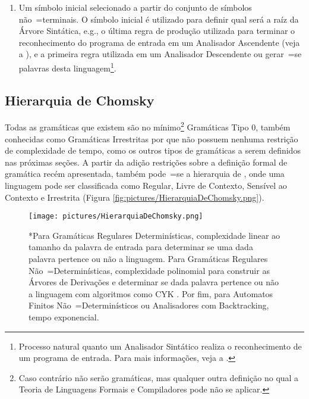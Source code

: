 {\begin{enumerate}
        \item Um símbolo inicial selecionado a partir do conjunto de símbolos não~=terminais.
        O símbolo inicial é utilizado para definir qual será a raíz da Árvore Sintática,
        e.g.,
        o última regra de produção utilizada para terminar o reconhecimento do programa de entrada em um Analisador Ascendente (veja a ),
        e a primeira regra utilizada em um Analisador Descendente ou
        gerar~=se palavras desta linguagem\footnote{
        Processo natural quanto um Analisador Sintático realiza o reconhecimento de um programa de entrada.
        Para mais informações,
        veja a .
        }.
    \end{enumerate}


\subsection{Hierarquia de Chomsky}
\label{hierarquiaDeChomsky}

    Todas as gramáticas que existem são no mínimo\footnote{
    Caso contrário não serão gramáticas,
    mas qualquer outra definição no qual a Teoria de Linguagens Formais e
    Compiladores pode não se aplicar.
    }
    Gramáticas Tipo 0,
    também conhecidas como Gramáticas Irrestritas por que não possuem nenhuma restrição de complexidade de tempo,
    como os outros tipos de gramáticas a serem definidos nas próximas seções{}.
    A partir da adição restrições sobre a definição formal de gramática recém apresentada,
    também pode~=se  a hierarquia de ,
    onde uma linguagem pode ser classificada como Regular,
    Livre de Contexto,
    Sensível ao Contexto e
    Irrestrita (Figura \ref{fig:pictures/HierarquiaDeChomsky.png}).
    \begin{figure}[h]
    \centering
    \texttt{[image: pictures/HierarquiaDeChomsky.png]}
    \begin{minipage}{\textwidth} \footnotesize
    *Para Gramáticas Regulares Determinísticas,
    complexidade linear ao tamanho da palavra de entrada para determinar se uma dada palavra pertence ou
    não a linguagem.
    Para Gramáticas Regulares Não~=Determinísticas,
    complexidade polinomial para construir as Árvores de Derivações e
    determinar se dada palavra pertence ou
    não a linguagem com algoritmos como CYK \cite{hopcroftBook,cykParsingAlgorithm}.
    Por fim,
    para Automatos Finitos Não~=Determinísticos ou
    Analisadores com Backtracking,
    tempo exponencial.


\end{minipage}
\end{figure}}
